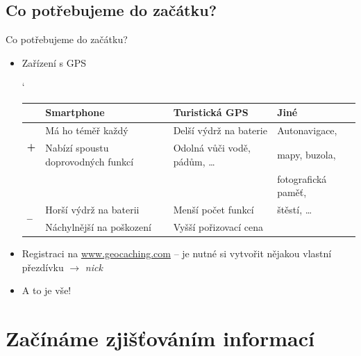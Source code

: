 \documentclass{beamer}
\begin{document}
	\subsection{Co potřebujeme do začátku?}
	\begin{frame}{Co potřebujeme do začátku?}
		\begin{itemize}
			\item Zařízení s GPS\\
			\begin{table}[ht]
				\catcode`
				\tiny
				\begin{tabular}[t]{|l|l|l|l|}
					\hline
					                                    & \textbf{Smartphone}                & \textbf{Turistická GPS}        & \textbf{Jiné}\\
					\hline
					\multirow{2}{*}{\textbf{\small +}}  & Má ho téměř každý                  & Delší výdrž na baterie         & Autonavigace,\\
					                                    & Nabízí spoustu doprovodných funkcí & Odolná vůči vodě, pádům, \dots & mapy, buzola,\\
					                                    &                                    &                                & fotografická paměť,\\
					\multirow{2}{*}{\textbf{\small --}} & Horší výdrž na baterii             & Menší počet funkcí             & štěstí, \dots\\
					                                    & Náchylnější na poškození           & Vyšší pořizovací cena          & \\
					\hline
				\end{tabular}
				\normalsize
			\end{table}
			\item Registraci na \url{www.geocaching.com} -- je nutné si vytvořit nějakou vlastní přezdívku $\rightarrow$ \emph{nick}
			\item A to je vše!
		\end{itemize}
	\end{frame}	
	
	\section{Začínáme zjišťováním informací}
\end{document}
